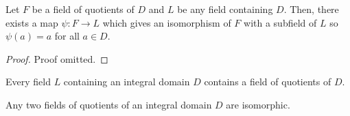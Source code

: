 \begin{theorem}
    Let $F$ be a field of quotients of $D$ and $L$ be any field containing $D$. Then, there exists a map $\psi\colon F\to L$ which gives an isomorphism of $F$ with a subfield of $L$ so $\psi(a) = a$ for all $a \in D$.
\end{theorem}
\begin{proof}
    Proof omitted.
\end{proof}
\begin{corollary}
    Every field $L$ containing an integral domain $D$ contains a field of quotients of $D$.
\end{corollary}
\begin{corollary}
    Any two fields of quotients of an integral domain $D$ are isomorphic.
\end{corollary}



